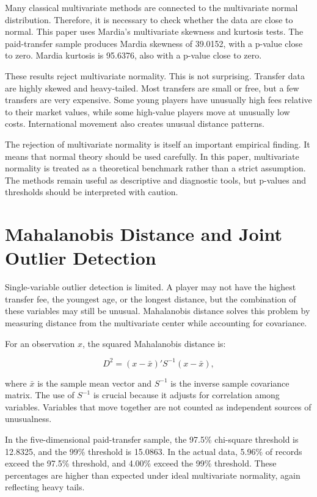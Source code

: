 \documentclass[12pt]{article}
\begin{document}
Many classical multivariate methods are connected to the multivariate normal distribution. Therefore, it is necessary to check whether the data are close to normal. This paper uses Mardia's multivariate skewness and kurtosis tests. The paid-transfer sample produces Mardia skewness of 39.0152, with a p-value close to zero. Mardia kurtosis is 95.6376, also with a p-value close to zero.

These results reject multivariate normality. This is not surprising. Transfer data are highly skewed and heavy-tailed. Most transfers are small or free, but a few transfers are very expensive. Some young players have unusually high fees relative to their market values, while some high-value players move at unusually low costs. International movement also creates unusual distance patterns.

The rejection of multivariate normality is itself an important empirical finding. It means that normal theory should be used carefully. In this paper, multivariate normality is treated as a theoretical benchmark rather than a strict assumption. The methods remain useful as descriptive and diagnostic tools, but p-values and thresholds should be interpreted with caution.

\section{Mahalanobis Distance and Joint Outlier Detection}

Single-variable outlier detection is limited. A player may not have the highest transfer fee, the youngest age, or the longest distance, but the combination of these variables may still be unusual. Mahalanobis distance solves this problem by measuring distance from the multivariate center while accounting for covariance.

For an observation $x$, the squared Mahalanobis distance is:

\begin{equation}
D^2 = (x-\bar{x})'S^{-1}(x-\bar{x}),
\end{equation}

where $\bar{x}$ is the sample mean vector and $S^{-1}$ is the inverse sample covariance matrix. The use of $S^{-1}$ is crucial because it adjusts for correlation among variables. Variables that move together are not counted as independent sources of unusualness.

In the five-dimensional paid-transfer sample, the 97.5\% chi-square threshold is 12.8325, and the 99\% threshold is 15.0863. In the actual data, 5.96\% of records exceed the 97.5\% threshold, and 4.00\% exceed the 99\% threshold. These percentages are higher than expected under ideal multivariate normality, again reflecting heavy tails.
\end{document}
